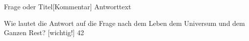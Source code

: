 \documentclass[a7paper]{kartei}
\begin{document}
\begin{karte}[Fach]{Frage oder Titel}[Kommentar] 
	Antworttext
\end{karte}
\begin{karte}[Lebensphilosophie]
	{Wie lautet die Antwort auf die Frage nach dem Leben dem Universum und dem Ganzen Rest?}
	[wichtig!]
	42
\end{karte}
\end{document}
